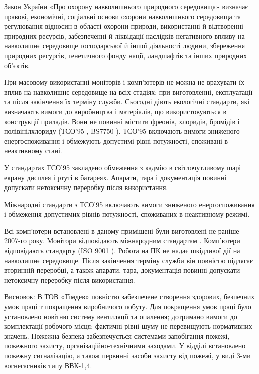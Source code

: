 Закон України «Про охорону навколишнього природного середовища» \cite{ber2} визначає правові, економічні, соціальні основи охорони навколишнього середовища та регулювання відносин в області охорони природи, використанні й відтворенні природних ресурсів, забезпеченні й ліквідації наслідків негативного впливу на навколишнє середовище господарської й іншої діяльності людини, збереження природних ресурсів, генетичного фонду нації, ландшафтів та інших природних об’єктів.

При масовому використанні моніторів і комп’ютерів не можна не врахувати їх вплив на навколишнє середовище на всіх стадіях: при виготовленні, експлуатації та після закінчення їх терміну служби. Сьогодні діють екологічні стандарти, які визначають вимоги до виробництва і матеріалів, що використовуються в конструкції приладів. Вони не повинні містити фреонів, хлоридів, бромідів і полівінілхлориду (ТСО’95 \cite{ber14}, BS7750 \cite{ber15}). ТСО’95 включають вимоги зниженого енергоспоживання і обмежують допустимі рівні потужності, споживані в неактивному стані.

У стандартах ТСО’95 закладено обмеження з кадмію в світлочутливому шарі екрану дисплея і ртуті в батареях. Апарати, тара і документація повинні допускати нетоксичну переробку після використання.

Міжнародні стандарти з ТСО’95 включають вимоги зниженого енергоспоживання і обмеження допустимих рівнів потужності, споживаних в неактивному режимі.

Всі комп’ютери встановлені в даному приміщені були виготовлені не раніше 2007-го року. Монітори відповідають міжнародним стандартам \cite{ber14}. Комп’ютери відповідають стандарту (ISO 9001 \cite{ber16}). Робота на ПК не надає шкідливої дії на навколишнє середовище. Після закінчення терміну служби він повністю підлягає вторинній переробці, а також апарати, тара, документація повинні допускати нетоксичну переробку після використання.

Висновок: В ТОВ «Тімдев» повністю забезпечене створення здорових, безпечних умов праці т покращення виробничого побуту. Для покращення умов праці було установлено новітню систему вентиляції та опалення; дотримано вимоги до комплектації робочого місця; фактичні рівні шуму не перевищують нормативних значень. Пожежна безпека забезпечується системами запобігання пожежі, пожежного захисту, організаційно-технічними заходами. У відділі встановлено пожежну сигналізацію, а також первинні засоби захисту від пожежі, у виді 3-ми вогнегасників типу ВВК-1,4.


